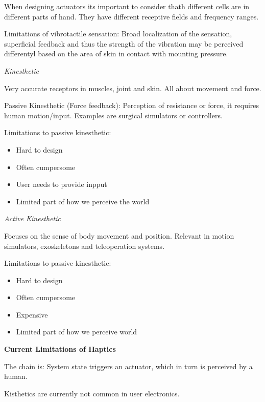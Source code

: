 When designing actuators its important to consider thath different cells are in different parts of hand. 
They have different receptive fields and frequency ranges. \smallskip

Limitations of vibrotactile sensation: Broad localization of the sensation, superficial feedback and thus the strength of the vibration may be perceived differentyl based on the area of skin in contact with mounting pressure. 
\medskip

\textit{Kinesthetic} \smallskip

Very accurate receptors in muscles, joint and skin. All about movement and force.  \smallskip

Passive Kinesthetic (Force feedback): Perception of resistance or force, it requires human motion/input. Examples are surgical simulators or controllers. 


Limitations to passive kinesthetic: 


\begin{itemize}[itemsep=-5pt, topsep=0pt, leftmargin=*]
	\item Hard to design
	\item Often cumpersome
	\item User needs to provide inpput
	\item Limited part of how we perceive the world
\end{itemize}


\textit{Active Kinesthetic} \smallskip

Focuses on the sense of body movement and position. Relevant in motion simulators, exoskeletons and teleoperation systems. 


Limitations to passive kinesthetic: 


\begin{itemize}[itemsep=-5pt, topsep=0pt, leftmargin=*]
	\item Hard to design
	\item Often cumpersome
	\item Expensive
	\item Limited part of how we perceive world
\end{itemize} \medskip

\textbf{Current Limitations of Haptics} \smallskip

The chain is: System state triggers an actuator, which in turn is perceived by a human.

Kisthetics are currently not common in user electronics. 

 


